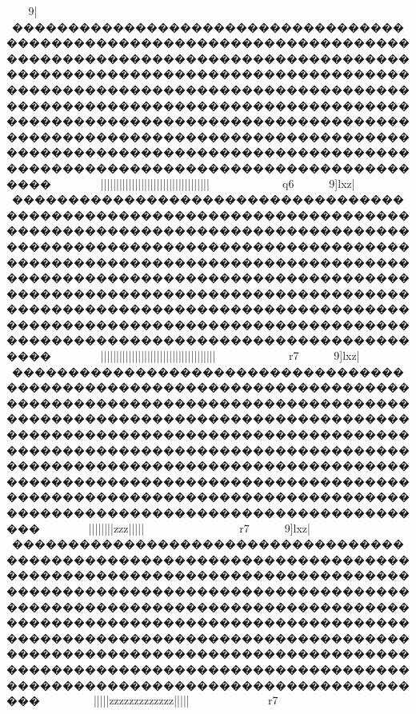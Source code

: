 {{{{{{{{{{{{{{{{{{{{{{{{{{{{{{{{{{{{{{{{{{{{{{{{{{{{{{{{{{{{{{{{{{{{{{{{{{{{{{{{{{{{{{{{{{{{{{{{{{{{{{{{{{{{{{{{{{{{{{{{{{{{{{{{{{{{{{{{{{{{{{{{{{{{{{{{{{{{{{{{{{{{{{{{{{{{{{{{{{{{{{{{{{{{{{{{{{{{{{{{{{{{{{{{{{{{{{{{{{{{{{{{{{{{{{{{{{{{{{{{{{{{{{{{{{{{{{{{{{{{{{{{{{{{{{{{{{{{{{{{{{{{{{{{{{{{{{{{{{{{{{{{{{{{{{{{{{{{{{{{{{{{{{{{{{{{{{{{{{{{{{{{{{{{{{{{{{{{{{{{{{{{{{{{{{{{{{{{{{{{{{{{{{{{{{{{{{{{{{{{{{{{{{{{{{{{{{{{{{{{{{{{{{{{{{{{{{{{{{{{{{{{{{{{{{{{{{{{{{{{{{{{{{{{{{{{{{{{{{{{{{{{{{{{{{{{{{{{{{{{{{{{{{{{{{{{{{{{{{{{{{{{{{{{{{{{{{{{{{{{{{{{{{{{{{{{{{{{{{{{{{{{{{{{{{{{{{{{{{{{{{{{{{{{{{{{{{9\lxz|}}}~���������������������������������������������������������������������������������������������������������������������������������������������������������������������������������������������������������������������������������������������������������������������������������������������������������������������������������������������������������������������������~~~~~~||||||||||||||||||{{{{{{{{{{{{{{{|||||||||}}}}||||||||}}}}}}}}}}}}~~~~~~~~q6
9]lxz|}}}~���������������������������������������������������������������������������������������������������������������������������������������������������������������������������������������������������������������������������������������������������������������������������������������������������������������������������������������������������������������������������~~~~~~||||||||||||||||||{{{{{{||{{{{{{{|||||||||}}}}||||||||}}}}}}}}}}}}~~~~~~~~r7
9]lxz|}}}~��������������������������������������������������������������������������������������������������������������������������������������������������������������������������������������������������������������������������������������������������������������������������������������������������������������������������������������������������������������������������~~~~~~~}}{{{{{{||||||||{{{{zzz{{{{{{{{{{{{{{{{|||||}}}}}}}}}}}}}}}}}}}}~~~~~~~~~~~~r7
9]lxz|}}}~��������������������������������������������������������������������������������������������������������������������������������������������������������������������������������������������������������������������������������������������������������������������������������������������������������������������������������������������������������������������������~~~~~~~~~}}{{{{{{||||{{{|{{{{zzzzzz{{zzzzzzz{{{{|||||}}}}}}}}}}}}}}}}}}}}~~~~}}}~~~~~r7
}}}}}}}}}}}}}}}}}}}}}}}}}}}}}}}}}}}}}}}}}}}}}}}}}}}}}}}}}}}}}}}}}}}}}}}}}}}}}}}}}}}}}}}}}}}}}}}}}}}}}}}}}}}}}}}}}}}}}}}}}}}}}}}}}}}}}}}}}}}}}}}}}}}}}}}}}}}}}}}}}}}}}}}}}}}}}}}}}}}}}}}}}}}}}}}}}}}}}}}}}}}}}}}}}}}}}}}}}}}}}}}}}}}}}}}}}}}}}}}}}}}}}}}}}}}}}}}}}}}}}}}}}}}}}}}}}}}}}}}}}}}}}}}}}}}}}}}}}}}}}}}}}}}}}}}}}}}}}}}}}}}}}}}}}}}}}}}}}}}}}}}}}}}}}}}}}}}}}}}}}}}}}}}}}}}}}}}}}}}}}}}}}}}}}}}}}}}}}}}}}}}}}}}}}}}}}}}}}}}}}}}}}}}}}}}}}}}}}}}}}}}}}}}}}}}}}}}}}}}}}}}}}}}}}}}}}}}}}}}}}}}}}}}}}}}}}}}}}}}}}}}}}}}}}}}}}}}}}}}}}}}}}}}}}}}}}}}}}}}}}}}}}}}}}}}}}}}}}}}}}}}}}}}}}}}}}}}}
